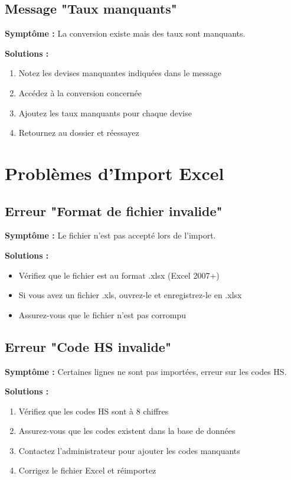 \documentclass[12pt,a4paper]{report}
\begin{document}
\subsection{Message "Taux manquants"}

\textbf{Symptôme :} La conversion existe mais des taux sont manquants.

\textbf{Solutions :}

\begin{enumerate}[leftmargin=*]
    \item Notez les devises manquantes indiquées dans le message
    \item Accédez à la conversion concernée
    \item Ajoutez les taux manquants pour chaque devise
    \item Retournez au dossier et réessayez
\end{enumerate}

\section{Problèmes d'Import Excel}

\subsection{Erreur "Format de fichier invalide"}

\textbf{Symptôme :} Le fichier n'est pas accepté lors de l'import.

\textbf{Solutions :}

\begin{itemize}[leftmargin=*]
    \item Vérifiez que le fichier est au format .xlsx (Excel 2007+)
    \item Si vous avez un fichier .xls, ouvrez-le et enregistrez-le en .xlsx
    \item Assurez-vous que le fichier n'est pas corrompu
\end{itemize}

\subsection{Erreur "Code HS invalide"}

\textbf{Symptôme :} Certaines lignes ne sont pas importées, erreur sur les codes HS.

\textbf{Solutions :}

\begin{enumerate}[leftmargin=*]
    \item Vérifiez que les codes HS sont à 8 chiffres
    \item Assurez-vous que les codes existent dans la base de données
    \item Contactez l'administrateur pour ajouter les codes manquants
    \item Corrigez le fichier Excel et réimportez
\end{enumerate}
\end{document}
